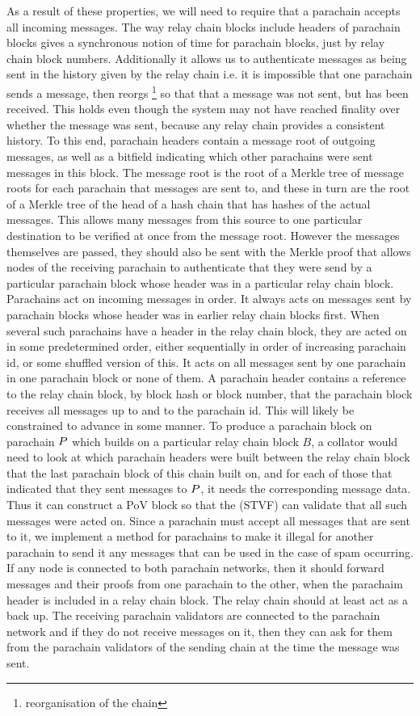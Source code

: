 As a result of these properties, we will need to require that a parachain accepts all incoming messages.
The way relay chain blocks include headers of parachain blocks gives a synchronous notion of time for parachain blocks,
just by relay chain block numbers. Additionally it allows us to authenticate messages as being sent in the history given by the relay chain
i.e. it is impossible that one parachain sends a message, then reorgs \footnote{reorganisation of the chain} so that that a message was not sent, but has been received. This holds even though the system may not have reached finality over whether the message was sent, because any relay chain provides a consistent history.
To this end, parachain headers contain a message root of outgoing messages, as well as a bitfield indicating which other parachains were sent messages in this block.
The message root is the root of a Merkle tree of message roots for each parachain that messages are sent to,
and these in turn are the root of a Merkle tree of the head of a hash chain that has hashes of the actual messages. This allows many messages from this source to one particular destination  to be verified at once from the message root.
However the messages themselves are passed, they should also be sent with the Merkle proof that allows nodes of the receiving parachain
to authenticate that they were send by a particular parachain block whose header was in a particular relay chain block. Parachains act on incoming messages in order. It always acts on messages sent by parachain blocks whose header was in earlier relay chain blocks first. When several such parachains have a header in the relay chain block, they are acted on in some predetermined order, either sequentially in order of increasing parachain id, or some shuffled version of this. It acts on all messages sent by one parachain in one parachain block or none of them. A parachain header contains a reference to the relay chain block, by block hash or block number, that the parachain block receives all messages up to and to the parachain id.
This will likely be constrained to advance in some manner. To produce a parachain block on parachain $P$ which builds on a particular relay chain block $B$,
a collator would need to look at which parachain headers were built between the relay chain block that the last parachain block of this chain built on,
and for each of those that indicated that they sent messages to $P$, it needs the corresponding message data.
Thus it can construct a PoV block so that the (STVF) can validate that all such messages were acted on. Since a parachain must accept all messages that are sent to it,
we implement a method for parachains to make it illegal for another parachain to send it any messages that can be used in the case of spam occurring. If any node is connected to both parachain networks, then it should forward messages and their proofs from one parachain to the other,
when the parachaim header is included in a relay chain block. The relay chain should at least act as a back up.
The receiving parachain validators are connected to the parachain network and if they do not receive messages on it, then they can ask for them from the parachain validators of the sending chain at the time the message was sent.

